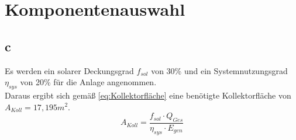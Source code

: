 \newpage
\section{Komponentenauswahl}
\label{sec:Komponentenauswahl}
\subsection{c}
Es werden ein solarer Deckungsgrad $f_{sol}$ von 30\% und ein Systemnutzungsgrad $\eta_{sys}$ von 20\% für die Anlage angenommen\cite[S.122]{Sick22}.\\
Daraus ergibt sich gemäß \autoref{eq:Kollektorfläche} eine benötigte Kollektorfläche von $A_{Koll}=17,195 m^2$.\\
\begin{equation}
    A_{Koll}= \frac{f_{sol} \cdot Q_{Ges}}{\eta_{sys} \cdot E_{gen}}
    \label{eq:Kollektorfläche}
\end{equation}